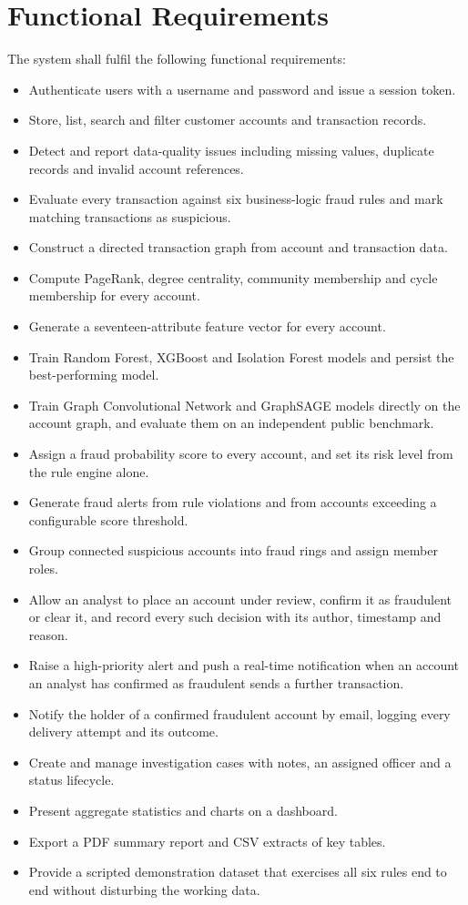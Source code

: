 \section{Functional Requirements}
The system shall fulfil the following functional requirements:

\begin{itemize}
  \item Authenticate users with a username and password and issue a session token.
  \item Store, list, search and filter customer accounts and transaction records.
  \item Detect and report data-quality issues including missing values, duplicate records and invalid account references.
  \item Evaluate every transaction against six business-logic fraud rules and mark matching transactions as suspicious.
  \item Construct a directed transaction graph from account and transaction data.
  \item Compute PageRank, degree centrality, community membership and cycle membership for every account.
  \item Generate a seventeen-attribute feature vector for every account.
  \item Train Random Forest, XGBoost and Isolation Forest models and persist the best-performing model.
  \item Train Graph Convolutional Network and GraphSAGE models directly on the account graph, and evaluate them on an independent public benchmark.
  \item Assign a fraud probability score to every account, and set its risk level from the rule engine alone.
  \item Generate fraud alerts from rule violations and from accounts exceeding a configurable score threshold.
  \item Group connected suspicious accounts into fraud rings and assign member roles.
  \item Allow an analyst to place an account under review, confirm it as fraudulent or clear it, and record every such decision with its author, timestamp and reason.
  \item Raise a high-priority alert and push a real-time notification when an account an analyst has confirmed as fraudulent sends a further transaction.
  \item Notify the holder of a confirmed fraudulent account by email, logging every delivery attempt and its outcome.
  \item Create and manage investigation cases with notes, an assigned officer and a status lifecycle.
  \item Present aggregate statistics and charts on a dashboard.
  \item Export a PDF summary report and CSV extracts of key tables.
  \item Provide a scripted demonstration dataset that exercises all six rules end to end without disturbing the working data.
\end{itemize}

